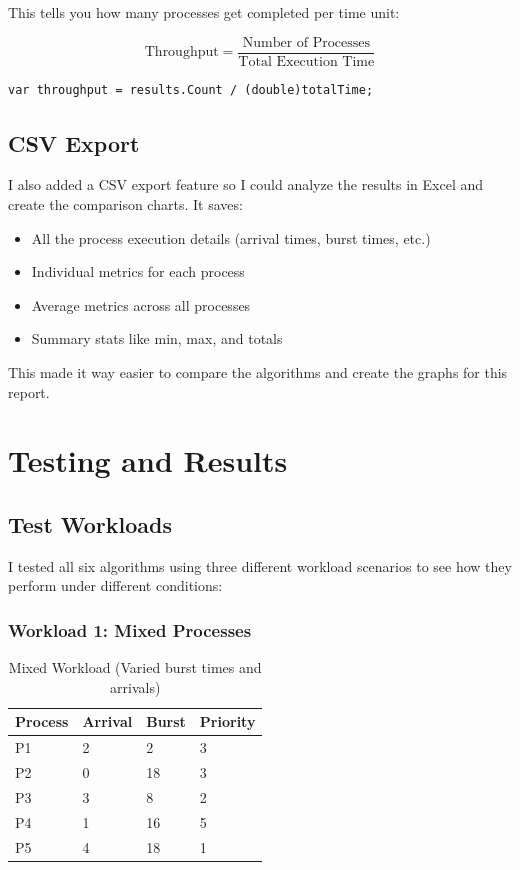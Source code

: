 \documentclass[12pt,letterpaper]{article}
\begin{document}
This tells you how many processes get completed per time unit:

\[
\text{Throughput} = \frac{\text{Number of Processes}}{\text{Total Execution Time}}
\]

\begin{lstlisting}[caption={Throughput Calculation}]
var throughput = results.Count / (double)totalTime;
\end{lstlisting}

\subsection{CSV Export}

I also added a CSV export feature so I could analyze the results in Excel and 
create the comparison charts. It saves:

\begin{itemize}
    \item All the process execution details (arrival times, burst times, etc.)
    \item Individual metrics for each process
    \item Average metrics across all processes
    \item Summary stats like min, max, and totals
\end{itemize}

This made it way easier to compare the algorithms and create the graphs for this report.

\newpage

\section{Testing and Results}

\subsection{Test Workloads}

I tested all six algorithms using three different workload scenarios to see how 
they perform under different conditions:

\subsubsection{Workload 1: Mixed Processes}
\begin{table}[H]
\centering
\caption{Mixed Workload (Varied burst times and arrivals)}
\begin{tabular}{@{}llll@{}}
\toprule
\textbf{Process} & \textbf{Arrival} & \textbf{Burst} & \textbf{Priority} \\ \midrule
P1 & 2 & 2 & 3 \\
P2 & 0 & 18 & 3 \\
P3 & 3 & 8 & 2 \\
P4 & 1 & 16 & 5 \\
P5 & 4 & 18 & 1 \\ \bottomrule
\end{tabular}
\end{table}
\end{document}
